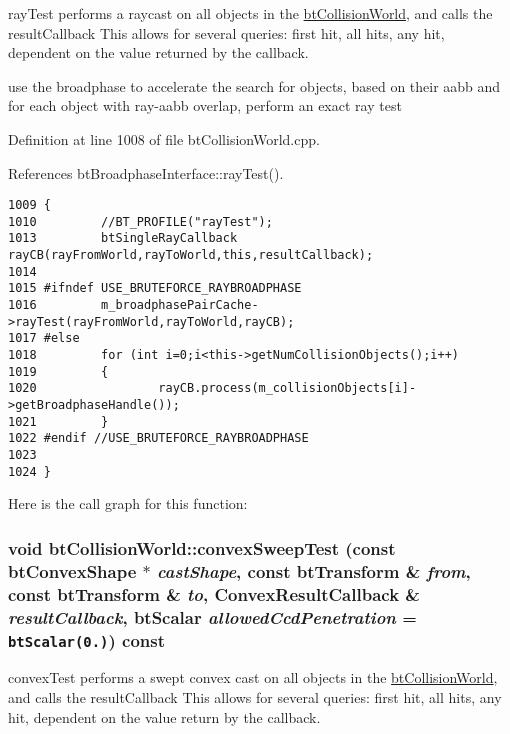 rayTest performs a raycast on all objects in the \hyperlink{classbt_collision_world}{btCollisionWorld}, and calls the resultCallback This allows for several queries: first hit, all hits, any hit, dependent on the value returned by the callback. 

use the broadphase to accelerate the search for objects, based on their aabb and for each object with ray-aabb overlap, perform an exact ray test 

Definition at line 1008 of file btCollisionWorld.cpp.

References btBroadphaseInterface::rayTest().

\begin{Code}\begin{verbatim}1009 {
1010         //BT_PROFILE("rayTest");
1013         btSingleRayCallback rayCB(rayFromWorld,rayToWorld,this,resultCallback);
1014 
1015 #ifndef USE_BRUTEFORCE_RAYBROADPHASE
1016         m_broadphasePairCache->rayTest(rayFromWorld,rayToWorld,rayCB);
1017 #else
1018         for (int i=0;i<this->getNumCollisionObjects();i++)
1019         {
1020                 rayCB.process(m_collisionObjects[i]->getBroadphaseHandle());
1021         }       
1022 #endif //USE_BRUTEFORCE_RAYBROADPHASE
1023 
1024 }
\end{verbatim}
\end{Code}




Here is the call graph for this function:\hypertarget{classbt_collision_world_eeee096b94a5eb31e8c88a29b6c69d37}{
\subsubsection[convexSweepTest]{\setlength{\rightskip}{0pt plus 5cm}void btCollisionWorld::convexSweepTest (const btConvexShape $\ast$ {\em castShape}, \/  const btTransform \& {\em from}, \/  const btTransform \& {\em to}, \/  {\bf ConvexResultCallback} \& {\em resultCallback}, \/  btScalar {\em allowedCcdPenetration} = {\tt btScalar(0.)}) const}}
\label{classbt_collision_world_eeee096b94a5eb31e8c88a29b6c69d37}


convexTest performs a swept convex cast on all objects in the \hyperlink{classbt_collision_world}{btCollisionWorld}, and calls the resultCallback This allows for several queries: first hit, all hits, any hit, dependent on the value return by the callback. 

